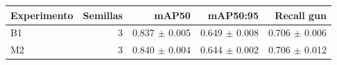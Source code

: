 \begin{tabular}{lrrrr}
\hline
Experimento & Semillas & mAP50 & mAP50:95 & Recall gun \\
\hline
B1 & 3 & 0.837 $\pm$ 0.005 & 0.649 $\pm$ 0.008 & 0.706 $\pm$ 0.006 \\
M2 & 3 & 0.840 $\pm$ 0.004 & 0.644 $\pm$ 0.002 & 0.706 $\pm$ 0.012 \\
\hline
\end{tabular}
